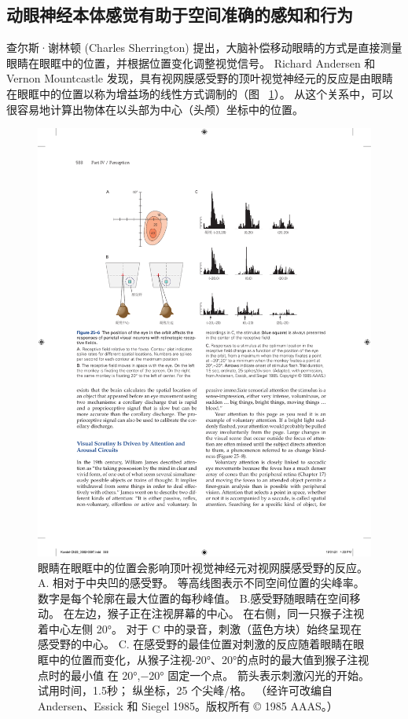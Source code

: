 \subsection{动眼神经本体感觉有助于空间准确的感知和行为}

查尔斯·谢林顿 (Charles Sherrington) 提出，大脑补偿移动眼睛的方式是直接测量眼睛在眼眶中的位置，并根据位置变化调整视觉信号。
Richard Andersen 和 Vernon Mountcastle 发现，具有视网膜感受野的顶叶视觉神经元的反应是由眼睛在眼眶中的位置以称为增益场的线性方式调制的（图 ~\ref{fig:25_6}）。
从这个关系中，可以很容易地计算出物体在以头部为中心（头颅）坐标中的位置。


\begin{figure}[htbp]
	\centering
	\includegraphics[width=0.7\linewidth]{chap25/fig_25_6}
	\caption{眼睛在眼眶中的位置会影响顶叶视觉神经元对视网膜感受野的反应。 A. 相对于中央凹的感受野。 等高线图表示不同空间位置的尖峰率。 数字是每个轮廓在最大位置的每秒峰值。 B.感受野随眼睛在空间移动。 在左边，猴子正在注视屏幕的中心。 在右侧，同一只猴子注视着中心左侧 20°。 对于 C 中的录音，刺激（蓝色方块）始终呈现在感受野的中心。 C. 在感受野的最佳位置对刺激的反应随着眼睛在眼眶中的位置而变化，从猴子注视-20°、20°的点时的最大值到猴子注视点时的最小值 在 20°,−20° 固定一个点。 箭头表示刺激闪光的开始。 试用时间，1.5秒； 纵坐标，25 个尖峰/格。 （经许可改编自 Andersen、Essick 和 Siegel 1985。版权所有 © 1985 AAAS。）}
	\label{fig:25_6}
\end{figure}


